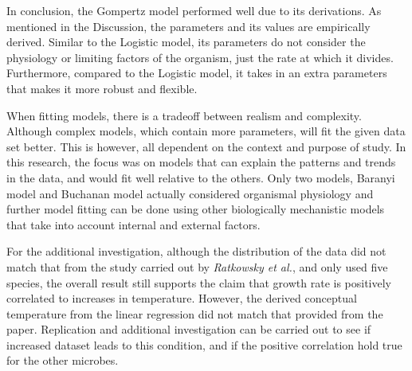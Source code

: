 In conclusion, the Gompertz model performed well due to its derivations. As mentioned in the Discussion, the parameters and its values are empirically derived. Similar to the Logistic model, its parameters do not consider the physiology or limiting factors of the organism, just the rate at which it divides. Furthermore, compared to the Logistic model, it takes in an extra parameters that makes it more robust and flexible.

When fitting models, there is a tradeoff between realism and complexity. Although complex models, which contain more parameters, will fit the given data set better. This is however, all dependent on the context and purpose of study. In this research, the focus was on  models that can explain the patterns and trends in the data, and would fit well relative to the others. Only two models, Baranyi model and Buchanan model actually considered organismal physiology and further model fitting can be done using other biologically mechanistic models that take into account internal and external factors.

For the additional investigation, although the distribution of the data did not match that from the study carried out by \textit{Ratkowsky et al.}, and only used five species, the overall result still supports the claim that growth rate is positively correlated to increases in temperature. However, the derived conceptual temperature from the linear regression did not match that provided from the paper. Replication and additional investigation can be carried out to see if increased dataset leads to this condition, and if the positive correlation hold true for the other microbes.
